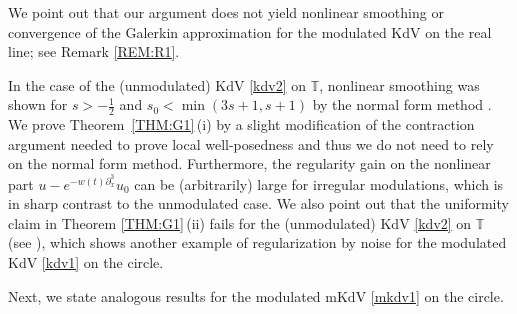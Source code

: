 \documentclass[letterpaper, 11pt,  reqno]{amsart}
\newcommand{\1}{\hspace{0.5mm}\text{I}\hspace{0.5mm}}
\newcommand{\T}{\mathbb{T}}
\newcommand{\dx}{\partial_x}
\numberwithin{equation}{section}
\numberwithin{theorem}{section}
\begin{document}
We point out that
our argument does not yield 
nonlinear smoothing or convergence 
of the Galerkin approximation 
for the modulated KdV on the real line;
see Remark \ref{REM:R1}.


In the case of the (unmodulated) KdV \eqref{kdv2} on $\T$, 
nonlinear smoothing 
was shown 
for $s > - \frac 12$ and $s_0 < \min(3s + 1, s + 1)$
by the normal form method
\cite{ETz}.
We prove  Theorem~\ref{THM:G1}\,(i)
by a slight modification of the contraction argument
needed to prove local well-posedness
and thus we do not need to rely on 
 the normal form method.
 Furthermore, 
 the regularity gain on the nonlinear part
$ u - e^{-w(t) \dx^3}u_0$
can be (arbitrarily) large
for irregular modulations,
which is in sharp contrast to the unmodulated case. 
We also point out that 
the uniformity claim in 
Theorem \ref{THM:G1}\,(ii)
fails for 
 the (unmodulated) KdV \eqref{kdv2} on $\T$
 (see \cite[Theorem 1.1]{CKSTT3}), 
 which shows another example of regularization by noise
 for the modulated KdV \eqref{kdv1} on the circle.



\medskip

Next, we state analogous results for the modulated mKdV \eqref{mkdv1} on the circle.
\end{document}
